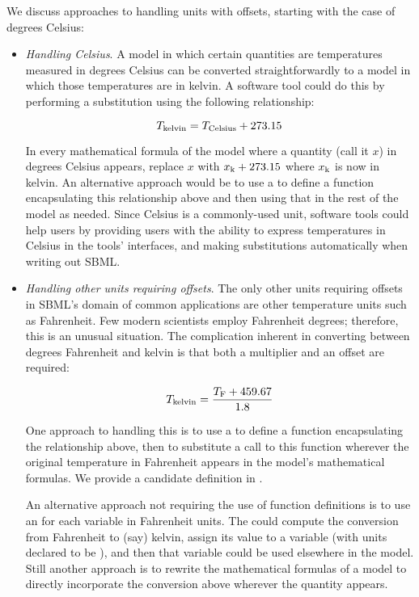 We discuss approaches to handling units with offsets, starting
with the case of degrees Celsius:
\begin{itemize}

\item \emph{Handling Celsius}.  A model in which certain
  quantities are temperatures measured in degrees Celsius can be
  converted straightforwardly to a model in which those
  temperatures are in kelvin.  A software tool could do this by
  performing a substitution using the following relationship:
  \begin{linenomath}
    \begin{equation*}
      T\sub{kelvin} = T\sub{Celsius} + 273.15
    \end{equation*}
  \end{linenomath}
  In every mathematical formula of the model where a quantity
  (call it $x$) in degrees Celsius appears, replace $x$ with $x\sub{k}
  + 273.15$ where $x\sub{k}$ is now in kelvin.  An alternative approach
  would be to use a \FunctionDefinition to define a function
  encapsulating this relationship above and then using that in the
  rest of the model as needed.  Since Celsius is a commonly-used
  unit, software tools could help users by providing users with
  the ability to express temperatures in Celsius in the tools'
  interfaces, and making substitutions automatically when writing
  out SBML.

\item \emph{Handling other units requiring offsets}.  The only
  other units requiring offsets in SBML's domain of common
  applications are other temperature units such as Fahrenheit.
  Few modern scientists employ Fahrenheit degrees; therefore, this
  is an unusual situation.  The complication inherent in
  converting between degrees Fahrenheit and kelvin is that both a
  multiplier and an offset are required:
  \begin{linenomath}
    \begin{equation*}
      T\sub{kelvin} = \frac{T\sub{F} + 459.67}{1.8}
      \label{eq:fah-kelvin}
    \end{equation*}
  \end{linenomath}

  One approach to handling this is to use a \FunctionDefinition to
  define a function encapsulating the relationship above, then to
  substitute a call to this function wherever the original
  temperature in Fahrenheit appears in the model's mathematical
  formulas.  We provide a candidate definition in
  . 

  An alternative approach not requiring the use of function
  definitions is to use an \AssignmentRule for each variable in
  Fahrenheit units.  The \AssignmentRule could compute the
  conversion from Fahrenheit to (say) kelvin, assign its value to
  a variable (with units declared to be ), and then
  that variable could be used elsewhere in the model.  Still
  another approach is to rewrite the mathematical formulas of a
  model to directly incorporate the conversion above wherever the
  quantity appears.

\end{itemize}

